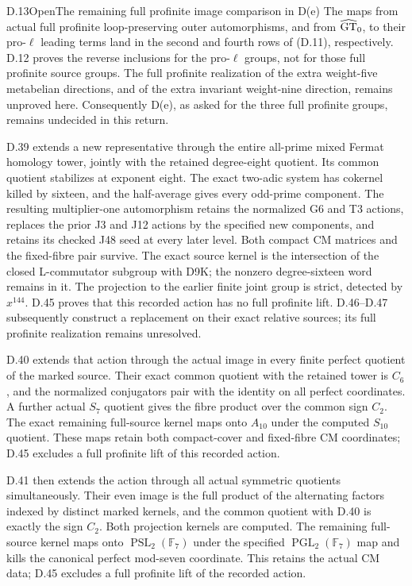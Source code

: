 \begin{statement}{D.13}{Open}{The remaining full profinite image comparison in D(e)}
The maps from actual full profinite loop-preserving outer automorphisms, and from $\widehat{\rm GT}_0$, to their pro-$\ell$ leading terms land in the second and fourth rows of (D.11), respectively. D.12 proves the reverse inclusions for the pro-$\ell$ groups, not for those full profinite source groups. The full profinite realization of the extra weight-five metabelian directions, and of the extra invariant weight-nine direction, remains unproved here. Consequently D(e), as asked for the three full profinite groups, remains undecided in this return.

D.39 extends a new representative through the entire all-prime mixed Fermat homology tower, jointly with the retained degree-eight quotient. Its common quotient stabilizes at exponent eight. The exact two-adic system has cokernel killed by sixteen, and the half-average gives every odd-prime component. The resulting multiplier-one automorphism retains the normalized G6 and T3 actions, replaces the prior J3 and J12 actions by the specified new components, and retains its checked J48 seed at every later level. Both compact CM matrices and the fixed-fibre pair survive. The exact source kernel is the intersection of the closed L-commutator subgroup with D9K; the nonzero degree-sixteen word remains in it. The projection to the earlier finite joint group is strict, detected by $x^{144}$. D.45 proves that this recorded action has no full profinite lift. D.46--D.47 subsequently construct a replacement on their exact relative sources; its full profinite realization remains unresolved.

D.40 extends that action through the actual image in every finite
perfect quotient of the marked source. Their exact common quotient
with the retained tower is $C_6$, and the normalized conjugators pair
with the identity on all perfect coordinates. A further actual
$S_7$ quotient gives the fibre product over the common sign $C_2$.
The exact remaining full-source kernel maps onto $A_{10}$ under the
computed $S_{10}$ quotient. These maps retain both compact-cover and
fixed-fibre CM coordinates; D.45 excludes a full profinite lift of this recorded action.

D.41 then extends the action through all actual symmetric quotients
simultaneously. Their even image is the full product of the
alternating factors indexed by distinct marked kernels, and the
common quotient with D.40 is exactly the sign $C_2$.
Both projection kernels are computed. The remaining full-source
kernel maps onto $\operatorname{PSL}_2(\mathbb F_7)$ under the
specified $\operatorname{PGL}_2(\mathbb F_7)$ map and kills the
canonical perfect mod-seven coordinate. This retains the actual
CM data; D.45 excludes a full profinite lift of the recorded action.


\end{statement}
